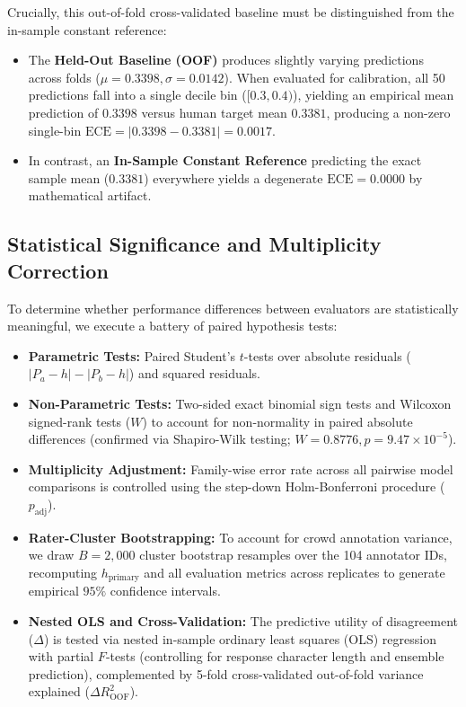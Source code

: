 Crucially, this out-of-fold cross-validated baseline must be distinguished from the in-sample constant reference:
\begin{itemize}
    \item The \textbf{Held-Out Baseline (OOF)} produces slightly varying predictions across folds ($\mu = 0.3398, \sigma = 0.0142$). When evaluated for calibration, all 50 predictions fall into a single decile bin ($[0.3, 0.4)$), yielding an empirical mean prediction of $0.3398$ versus human target mean $0.3381$, producing a non-zero single-bin $\text{ECE} = |0.3398 - 0.3381| = 0.0017$.
    \item In contrast, an \textbf{In-Sample Constant Reference} predicting the exact sample mean ($0.3381$) everywhere yields a degenerate $\text{ECE} = 0.0000$ by mathematical artifact.
\end{itemize}

\subsection{Statistical Significance and Multiplicity Correction}
\label{sec:statistical_testing}

To determine whether performance differences between evaluators are statistically meaningful, we execute a battery of paired hypothesis tests:
\begin{itemize}
    \item \textbf{Parametric Tests:} Paired Student's $t$-tests over absolute residuals ($|P_a - h| - |P_b - h|$) and squared residuals.
    \item \textbf{Non-Parametric Tests:} Two-sided exact binomial sign tests and Wilcoxon signed-rank tests ($W$) to account for non-normality in paired absolute differences (confirmed via Shapiro-Wilk testing; $W = 0.8776, p = 9.47 \times 10^{-5}$).
    \item \textbf{Multiplicity Adjustment:} Family-wise error rate across all pairwise model comparisons is controlled using the step-down Holm-Bonferroni procedure ($p_{\text{adj}}$).
    \item \textbf{Rater-Cluster Bootstrapping:} To account for crowd annotation variance, we draw $B = 2,000$ cluster bootstrap resamples over the 104 annotator IDs, recomputing $h_{\text{primary}}$ and all evaluation metrics across replicates to generate empirical $95\%$ confidence intervals.
    \item \textbf{Nested OLS and Cross-Validation:} The predictive utility of disagreement ($\Delta$) is tested via nested in-sample ordinary least squares (OLS) regression with partial $F$-tests (controlling for response character length and ensemble prediction), complemented by 5-fold cross-validated out-of-fold variance explained ($\Delta R^2_{\text{OOF}}$).
\end{itemize}
